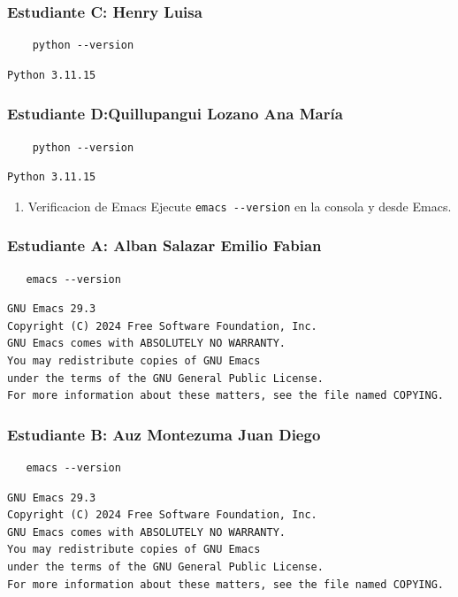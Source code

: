 \documentclass{article}
\begin{document}
\subsubsection{Estudiante C: Henry Luisa}
\label{sec:org21fec83}
\begin{verbatim}
    python --version
\end{verbatim}
\begin{verbatim}
Python 3.11.15
\end{verbatim}
\subsubsection{Estudiante D:Quillupangui Lozano Ana María}
\label{sec:org68317d2}
\begin{verbatim}
    python --version 
\end{verbatim}
\begin{verbatim}
Python 3.11.15
\end{verbatim}



\begin{enumerate}
\item Verificacion de Emacs
Ejecute \texttt{emacs -{}-{}version} en la consola y desde Emacs.
\end{enumerate}
\subsubsection{Estudiante A: Alban Salazar Emilio Fabian}
\label{sec:orgd79bfb2}
\begin{verbatim}
   emacs --version
\end{verbatim}
\begin{verbatim}
GNU Emacs 29.3
Copyright (C) 2024 Free Software Foundation, Inc.
GNU Emacs comes with ABSOLUTELY NO WARRANTY.
You may redistribute copies of GNU Emacs
under the terms of the GNU General Public License.
For more information about these matters, see the file named COPYING.
\end{verbatim}
\subsubsection{Estudiante B: Auz Montezuma Juan Diego}
\label{sec:org172d399}
\begin{verbatim}
   emacs --version
\end{verbatim}
\begin{verbatim}
GNU Emacs 29.3
Copyright (C) 2024 Free Software Foundation, Inc.
GNU Emacs comes with ABSOLUTELY NO WARRANTY.
You may redistribute copies of GNU Emacs
under the terms of the GNU General Public License.
For more information about these matters, see the file named COPYING.
\end{verbatim}
\end{document}
